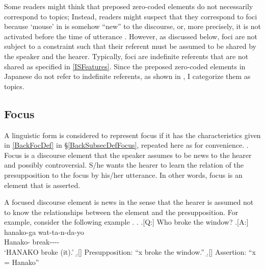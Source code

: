 %

Some readers might think that preposed zero-coded elements do not necessarily correspond to topics;
Instead, readers might suspect that they correspond to foci
because  `mouse' in \LLast is somehow ``new'' to the discourse,
or, more precisely,
it is not activated before the time of utterance \LLast[Y].
However, as discussed below,
foci are not subject to a constraint such that their referent must be assumed to be shared by the speaker and the hearer.
Typically, foci are indefinite referents that are not shared as specified in \ref{ISFeatures}.
Since the preposed zero-coded elements in Japanese do not refer to indefinite referents, as shown in \Last,
I categorize them as topics.

\subsection{Focus}\label{FrameworkFocus}

A linguistic form is considered to represent focus if it has the characteristics given in \ref{BackFocDef} in \S \ref{BackSubsecDefFocus},
repeated here as \Next for convenience.
%
\ex. Focus is a discourse element that the speaker assumes to be news to the hearer and possibly controversial.
S/he wants the hearer to learn the relation of the presupposition to the focus by his/her utterance.
In other words, focus is an element that is asserted.
\label{FocDef}

A focused discourse element is news in the sense that
the hearer is assumed not to know the relationships between the element and the presupposition.
For example,
consider the following example \Next.
\ex. \a.[Q:] Who broke the window?
	\bg.[A:] hanako-ga wat-ta-n-da-yo \\
		Hanako- break---- \\
		`HANAKO broke (it).'
	\b.[] Presupposition: ``x broke the window.''
	\b.[] Assertion: ``x = Hanako''

